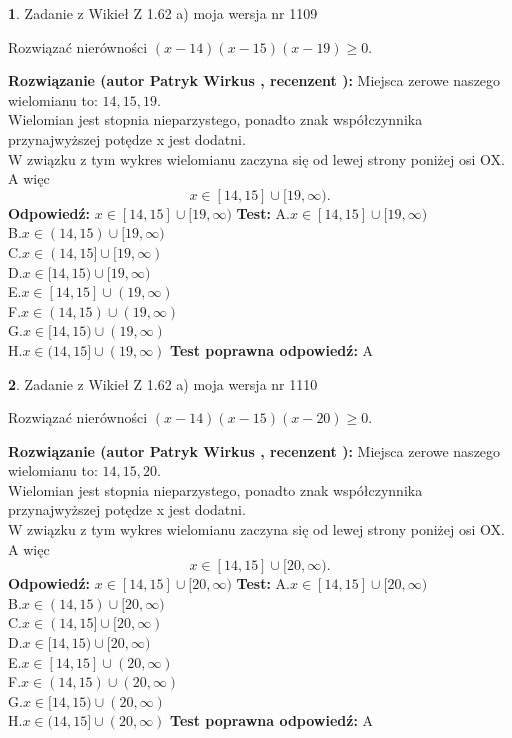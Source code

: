 \documentclass[12pt, a4paper]{article}
\theoremstyle{definition} %
\newtheorem{zad}{}
\newcommand{\zadStart}[1]{\begin{zad}#1\newline}
\newcommand{\zadStop}{\end{zad}}
\newcommand{\rozwStart}[2]{\noindent \textbf{Rozwiązanie (autor #1 , recenzent #2): }\newline}
\newcommand{\rozwStop}{\newline}
\newcommand{\odpStart}{\noindent \textbf{Odpowiedź:}\newline}
\newcommand{\odpStop}{\newline}
\newcommand{\testStart}{\noindent \textbf{Test:}\newline}
\newcommand{\testStop}{\newline}
\newcommand{\kluczStart}{\noindent \textbf{Test poprawna odpowiedź:}\newline}
\newcommand{\kluczStop}{\newline}
\begin{document}
\zadStart{Zadanie z Wikieł Z 1.62 a) moja wersja nr 1109}

Rozwiązać nierówności $(x-14)(x-15)(x-19)\ge0$.
\zadStop
\rozwStart{Patryk Wirkus}{}
Miejsca zerowe naszego wielomianu to: $14, 15, 19$.\\
Wielomian jest stopnia nieparzystego, ponadto znak współczynnika przy\linebreak najwyższej potędze x jest dodatni.\\ W związku z tym wykres wielomianu zaczyna się od lewej strony poniżej osi OX. A więc $$x \in [14,15] \cup [19,\infty).$$
\rozwStop
\odpStart
$x \in [14,15] \cup [19,\infty)$
\odpStop
\testStart
A.$x \in [14,15] \cup [19,\infty)$\\
B.$x \in (14,15) \cup [19,\infty)$\\
C.$x \in (14,15] \cup [19,\infty)$\\
D.$x \in [14,15) \cup [19,\infty)$\\
E.$x \in [14,15] \cup (19,\infty)$\\
F.$x \in (14,15) \cup (19,\infty)$\\
G.$x \in [14,15) \cup (19,\infty)$\\
H.$x \in (14,15] \cup (19,\infty)$
\testStop
\kluczStart
A
\kluczStop



\zadStart{Zadanie z Wikieł Z 1.62 a) moja wersja nr 1110}

Rozwiązać nierówności $(x-14)(x-15)(x-20)\ge0$.
\zadStop
\rozwStart{Patryk Wirkus}{}
Miejsca zerowe naszego wielomianu to: $14, 15, 20$.\\
Wielomian jest stopnia nieparzystego, ponadto znak współczynnika przy\linebreak najwyższej potędze x jest dodatni.\\ W związku z tym wykres wielomianu zaczyna się od lewej strony poniżej osi OX. A więc $$x \in [14,15] \cup [20,\infty).$$
\rozwStop
\odpStart
$x \in [14,15] \cup [20,\infty)$
\odpStop
\testStart
A.$x \in [14,15] \cup [20,\infty)$\\
B.$x \in (14,15) \cup [20,\infty)$\\
C.$x \in (14,15] \cup [20,\infty)$\\
D.$x \in [14,15) \cup [20,\infty)$\\
E.$x \in [14,15] \cup (20,\infty)$\\
F.$x \in (14,15) \cup (20,\infty)$\\
G.$x \in [14,15) \cup (20,\infty)$\\
H.$x \in (14,15] \cup (20,\infty)$
\testStop
\kluczStart
A
\kluczStop
\end{document}
